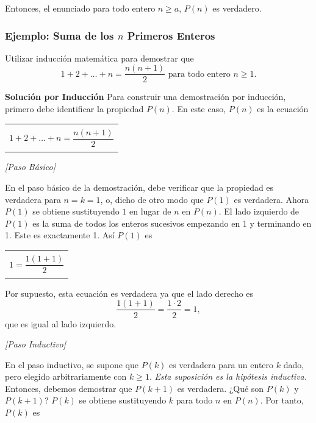 \documentclass{article}
\begin{document}
Entonces, el enunciado para todo entero $n \geq a$, $P(n)$ es verdadero.

\subsubsection{Ejemplo: Suma de los \texorpdfstring{$n$}{n} Primeros Enteros}
\label{sec:ejemplo-suma-enteros}

\noindent Utilizar inducción matemática para demostrar que
\[
1 + 2 + \dots + n = \frac{n(n + 1)}{2} \text{ para todo entero } n \geq 1.
\]

\bigskip
\noindent \textbf{Solución por Inducción} \quad Para construir una demostración por inducción, primero debe identificar la propiedad $P(n)$. En este caso, $P(n)$ es la ecuación
\begin{center}
    \begin{tabular}{|c|}
        \hline
        \\
        $1 + 2 + \dots + n = \dfrac{n(n + 1)}{2}$ \\
        \\
        \hline
    \end{tabular} 
\end{center}

\bigskip
\textit{[Paso Básico]}

En el paso básico de la demostración, debe verificar que la propiedad es verdadera para $n = k = 1$, o, dicho de otro modo que $P(1)$ es verdadera. Ahora $P(1)$ se obtiene sustituyendo $1$ en lugar de $n$ en $P(n)$. El lado izquierdo de $P(1)$ es la suma de todos los enteros sucesivos empezando en 1 y terminando en 1. Este es exactamente 1. Así $P(1)$ es

\begin{center}
    \begin{tabular}{|c|}
        \hline
        \\
        $1 = \dfrac{1(1 + 1)}{2}$ \\
        \\
        \hline
    \end{tabular} 
\end{center}

Por supuesto, esta ecuación es verdadera ya que el lado derecho es
\[
\frac{1(1 + 1)}{2} = \frac{1 \cdot 2}{2} = 1,
\]
que es igual al lado izquierdo.

\bigskip
\textit{[Paso Inductivo]}

En el paso inductivo, se supone que $P(k)$ es verdadera para un entero $k$ dado, pero elegido arbitrariamente con $k \geq 1$. \textit{Esta suposición es la hipótesis inductiva.} Entonces, debemos demostrar que $P(k + 1)$ es verdadera. ¿Qué son $P(k)$ y $P(k + 1)$? $P(k)$ se obtiene sustituyendo $k$ para todo $n$ en $P(n)$. Por tanto, $P(k)$ es
\end{document}
